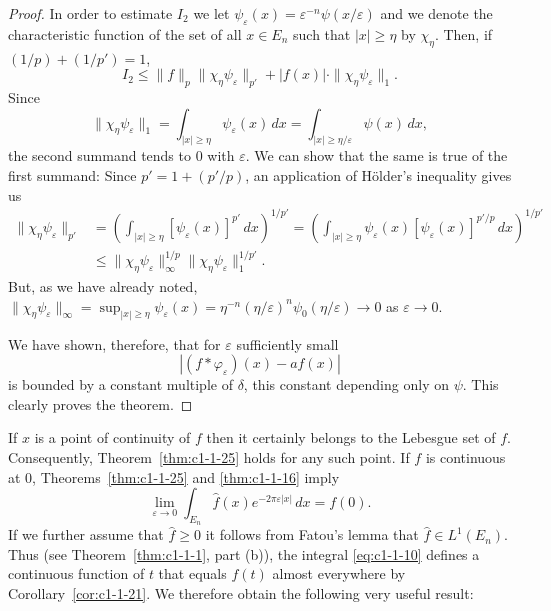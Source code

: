 \begin{proof}
In order to estimate $I_{2}$ we let
$\psi_{\varepsilon}(x) = \varepsilon^{-n}\psi(x/\varepsilon)$ and we denote the
characteristic function of the set of all $x \in E_{n}$ such that $|x| \geq \eta$
by $\chi_{\eta}$. Then, if $(1/p) + (1/p') = 1$,
\[
I_{2}\leq\|f\|_{p}\|\chi_{\eta}\psi_{\varepsilon}\|_{p'}+|f(x)|\cdot\|\chi_{\eta}\psi_{\varepsilon}\|_{1}.
\]
Since
\[
\|\chi_{\eta}\psi_{\varepsilon}\|_{1}
=\int_{|x|\geq\eta}\psi_{\varepsilon}(x)\,dx
=\int_{|x|\geq\eta/\varepsilon}\psi(x)\,dx,
\]
the second summand tends to $0$ with $\varepsilon$. We can show that the same is
true of the first summand: Since $p' = 1 + (p'/p)$, an application of H\"older's
inequality gives us
\begin{align*}
\|\chi_{\eta}\psi_{\varepsilon}\|_{p'}
&=\left(\int_{|x|\geq\eta}[\psi_{\varepsilon}(x)]^{p'}\,dx\right)^{1/p'}
=\left(\int_{|x|\geq\eta}\psi_{\varepsilon}(x)[\psi_{\varepsilon}(x)]^{p'/p}\,dx\right)^{1/p'}\\
&\leq\|\chi_{\eta}\psi_{\varepsilon}\|_{\infty}^{1/p}\|\chi_{\eta}\psi_{\varepsilon}\|_{1}^{1/p'}.
\end{align*}
But, as we have already noted,
$\|\chi_{\eta}\psi_{\varepsilon}\|_{\infty} = \sup_{|x| \geq \eta} \psi_{\varepsilon}(x) = \eta^{-n}(\eta/\varepsilon)^{n}\psi_{0}(\eta/\varepsilon) \to 0$
as $\varepsilon \to 0$.

We have shown, therefore, that for $\varepsilon$ sufficiently small
\[
|(f*\varphi_{\varepsilon})(x)-af(x)|
\]
is bounded by a constant multiple of $\delta$, this constant depending only on
$\psi$. This clearly proves the theorem.
\end{proof}

If $x$ is a point of continuity of $f$ then it certainly belongs to the Lebesgue
set of $f$. Consequently, Theorem~\ref{thm:c1-1-25} holds for any such point. If
$f$ is continuous at $0$, Theorems~\ref{thm:c1-1-25} and \ref{thm:c1-1-16} imply
\[
\lim_{\varepsilon\to0}\int_{E_{n}}\hat{f}(x)e^{-2\pi\varepsilon|x|}\,dx=f(0).
\]
If we further assume that $\hat{f} \geq 0$ it follows from Fatou's lemma that
$\hat{f} \in L^{1}(E_{n})$. Thus (see Theorem~\ref{thm:c1-1-1}, part (b)), the
integral \eqref{eq:c1-1-10} defines a continuous function of $t$ that equals
$f(t)$ almost everywhere by Corollary~\ref{cor:c1-1-21}. We therefore obtain the
following very useful result:

